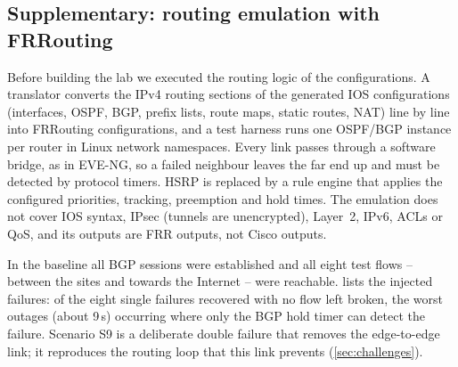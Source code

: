 \subsection{Supplementary: routing emulation with FRRouting}\label{sec:emulation}
Before building the lab we executed the routing logic of the configurations. A translator converts the IPv4
routing sections of the generated IOS configurations (interfaces, OSPF, BGP, prefix lists, route maps,
static routes, NAT) line by line into FRRouting \cite{frr} configurations, and a test harness runs one OSPF/BGP
instance per router in Linux network namespaces. Every link passes through a software bridge, as in EVE-NG,
so a failed neighbour leaves the far end up and must be detected by protocol timers. HSRP is replaced by a
rule engine that applies the configured priorities, tracking, preemption and hold times. The emulation does
not cover IOS syntax, IPsec (tunnels are unencrypted), Layer~2, IPv6, ACLs or QoS, and its outputs are FRR
outputs, not Cisco outputs.

In the baseline all \FactEmuBgpSessions{} BGP sessions were established and all eight test flows -- between
the sites and towards the Internet -- were reachable.  lists the injected failures:
\FactEmuPassed{} of the eight single failures recovered with no flow left broken, the worst outages (about
9\,s) occurring where only the BGP hold timer can detect the failure. Scenario S9 is a deliberate double
failure that removes the edge-to-edge link; it reproduces the routing loop that this link prevents
(\cref{sec:challenges}).

